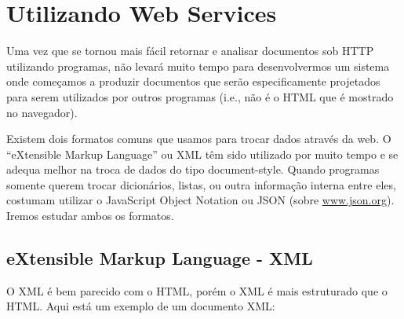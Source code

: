 
\chapter{Utilizando Web Services}

Uma vez que se tornou mais fácil retornar e analisar documentos
sob HTTP utilizando programas, não levará muito tempo para desenvolvermos
um sistema onde começamos a produzir documentos que serão
especificamente projetados para serem utilizados por outros
programas (i.e., não é o HTML que é mostrado no navegador).

Existem dois formatos comuns que usamos para trocar dados através da web.
O ``eXtensible Markup Language'' ou XML têm sido utilizado por muito tempo
e se adequa melhor na troca de dados do tipo document-style. Quando programas somente
querem trocar dicionários, listas, ou outra informação interna entre eles, 
costumam utilizar o JavaScript Object Notation ou JSON (sobre \url{www.json.org}).
Iremos estudar ambos os formatos.

\section{eXtensible Markup Language - XML}

O XML é bem parecido com o HTML, porém o XML é mais estruturado
que o HTML. Aqui está um exemplo de um documento XML:

